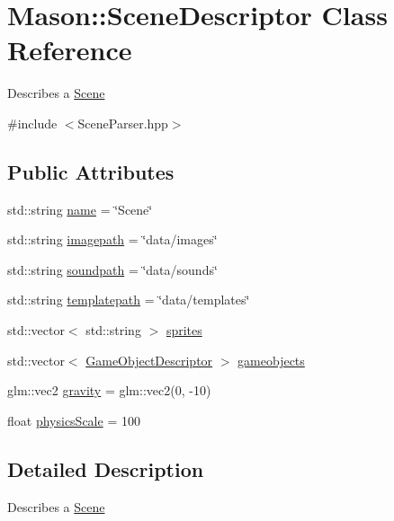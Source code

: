\hypertarget{class_mason_1_1_scene_descriptor}{}\section{Mason\+:\+:Scene\+Descriptor Class Reference}
\label{class_mason_1_1_scene_descriptor}


Describes a \hyperlink{class_mason_1_1_scene}{Scene} ~\newline
  




{\ttfamily \#include $<$Scene\+Parser.\+hpp$>$}

\subsection*{Public Attributes}
\begin{DoxyCompactItemize}
\item 
std\+::string \hyperlink{class_mason_1_1_scene_descriptor_a847493eddb3e379f1b8e9308f2de8eb0}{name} = \char`\"{}Scene\char`\"{}
\item 
std\+::string \hyperlink{class_mason_1_1_scene_descriptor_a32d312e0bb11e5e3f5419f5d3a6d002a}{imagepath} = \char`\"{}data/images\char`\"{}
\item 
std\+::string \hyperlink{class_mason_1_1_scene_descriptor_acd7e349dc63b0692c2f4912765db2cbe}{soundpath} = \char`\"{}data/sounds\char`\"{}
\item 
std\+::string \hyperlink{class_mason_1_1_scene_descriptor_a5790bbda9414295660aa96be5824dbbb}{templatepath} = \char`\"{}data/templates\char`\"{}
\item 
std\+::vector$<$ std\+::string $>$ \hyperlink{class_mason_1_1_scene_descriptor_a0037cbfd772bbacb81017de405276475}{sprites}
\item 
std\+::vector$<$ \hyperlink{class_mason_1_1_game_object_descriptor}{Game\+Object\+Descriptor} $>$ \hyperlink{class_mason_1_1_scene_descriptor_a1883e270cf9361e9797269cc0bed1bbc}{gameobjects}
\item 
glm\+::vec2 \hyperlink{class_mason_1_1_scene_descriptor_a7d9c12b3d2176d2012a22824113c7b56}{gravity} = glm\+::vec2(0, -\/10)
\item 
float \hyperlink{class_mason_1_1_scene_descriptor_a800b682b3cadc6d6830e9bf23f01c958}{physics\+Scale} = 100
\end{DoxyCompactItemize}


\subsection{Detailed Description}
Describes a \hyperlink{class_mason_1_1_scene}{Scene} ~\newline
 

